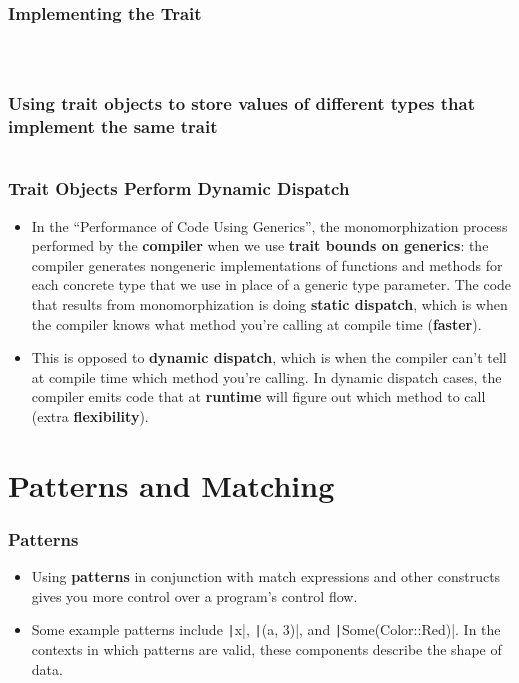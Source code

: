 \documentclass{beamer}
\begin{document}
	\begin{frame}[fragile]
	\frametitle{Implementing the Trait}
	\begin{columns}
		\inputminted[fontsize=\scriptsize]{rust}{./code/oop4.rs}
		\inputminted[fontsize=\scriptsize]{rust}{./code/oop5.rs}
	\end{columns}
\end{frame}


	\begin{frame}[fragile]
	\frametitle{Using trait objects to store values of different types that implement the same trait}
		\inputminted[fontsize=\scriptsize]{rust}{./code/oop6.rs}
\end{frame}


	\begin{frame}[fragile]
	\frametitle{Trait Objects Perform Dynamic Dispatch}
	\begin{itemize}
		\item  In the “Performance of Code Using Generics”, the monomorphization process performed by the \textbf{compiler} when we use \textbf{trait bounds on generics}: the compiler generates nongeneric implementations of functions and methods for each concrete type that we use in place of a generic type parameter. The code that results from monomorphization is doing \textbf{static dispatch}, which is when the compiler knows what method you’re calling at compile time (\textbf{faster}). 
		\item 	 This is opposed to \textbf{dynamic dispatch}, which is when the compiler can’t tell at compile time which method you’re calling. In dynamic dispatch cases, the compiler emits code that at \textbf{runtime} will figure out which method to call (extra \textbf{flexibility}).
	\end{itemize}
\end{frame}


\section{Patterns and Matching}


\begin{frame}[fragile]
	\frametitle{Patterns}
	\begin{itemize}
		\item Using \textbf{patterns} in conjunction with match expressions and other constructs gives you more control over a program’s control flow.
		\item 	Some example patterns include \texttt|x|, \texttt|(a, 3)|, and \texttt|Some(Color::Red)|. In the contexts in which patterns are valid, these components describe the shape of data. 
	\end{itemize}
\end{frame}
\end{document}
